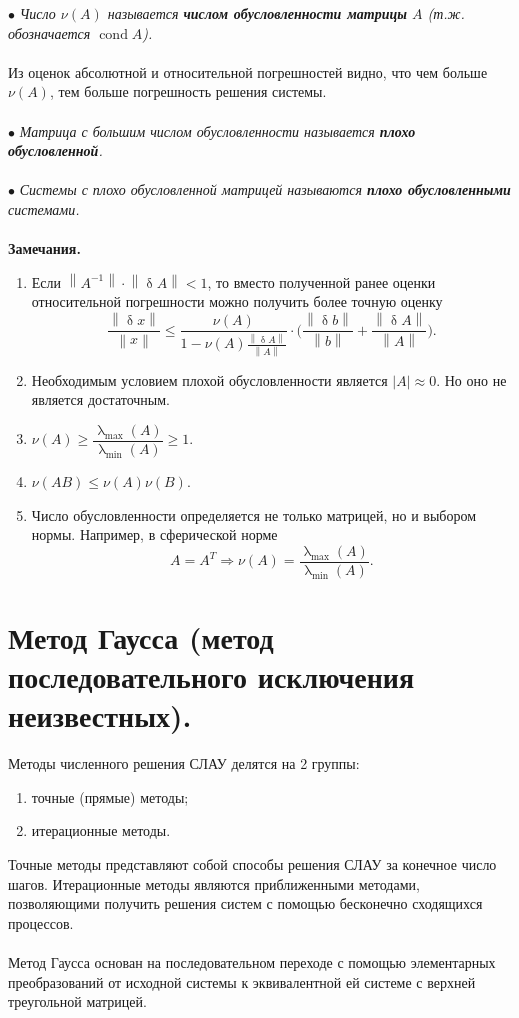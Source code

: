 \documentclass[a4paper, 12pt]{report}
\renewcommand{\leq}{\leqslant}
\renewcommand{\geq}{\geqslant}
\renewcommand{\delta}{\updelta}
\renewcommand{\lambda}{\uplambda}
\newcommand\Norm[1]{\left\| #1 \right\|}
\begin{document}
	$\bullet$ \textit{Число $\nu(A)$ называется \textbf{числом обусловленности матрицы} $A$ (т.ж. обозначается $\operatorname{cond}A$).}\\\\
	Из оценок абсолютной и относительной погрешностей видно, что чем больше $\nu (A)$, тем больше погрешность решения системы.\\\\
	$\bullet$ \textit{Матрица с большим числом обусловленности называется \textbf{плохо обусловленной}.}\\\\
	$\bullet$ \textit{Системы с плохо обусловленной матрицей называются \textbf{плохо обусловленными} системами.}\\\\
	\textbf{Замечания.}\begin{enumerate}
		\item Если $\Norm{A^{-1}}\cdot \Norm{\delta A} < 1$, то вместо полученной ранее оценки относительной погрешности можно получить более точную оценку $$\dfrac{\Norm{\delta x}}{\Norm{x}}\leq \dfrac{\nu (A)}{1 - \nu(A)\frac{\Norm{\delta A}}{\Norm{A}}} \cdot \Big(\dfrac{\Norm{\delta b}}{\Norm{b}} + \dfrac{\Norm{\delta A}}{\Norm{A}}\Big).$$
		\item Необходимым условием плохой обусловленности является $|A| \approx 0$. Но оно не является достаточным.
		\item $\nu(A)\geq \dfrac{\lambda_{\max}(A)}{\lambda_{\min}(A)}\geq 1.$
		\item $\nu(AB)\leq \nu(A)\nu(B)$.
		\item Число обусловленности определяется не только матрицей, но и выбором нормы. Например, в сферической норме $$A = A^T\Rightarrow \nu(A) = \dfrac{\lambda_{\max}(A)}{\lambda_{\min}(A)}.$$
	\end{enumerate}
	\section{Метод Гаусса (метод последовательного исключения неизвестных).}
	Методы численного решения СЛАУ делятся на 2 группы:\begin{enumerate}
		\item точные (прямые) методы;
		\item итерационные методы.
	\end{enumerate}
	Точные методы представляют собой способы решения СЛАУ за конечное число шагов. Итерационные методы являются приближенными методами, позволяющими получить решения систем с помощью бесконечно сходящихся процессов.\\\\
	Метод Гаусса основан на последовательном переходе с помощью элементарных преобразований от исходной системы к эквивалентной ей системе с верхней треугольной матрицей.
\end{document}
